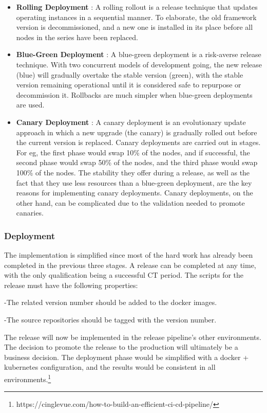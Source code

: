    \begin{itemize}
     \item \textbf{Rolling Deployment} :  A rolling rollout is a release technique that updates operating instances in a sequential manner. To elaborate, the old framework version is decommissioned, and a new one is installed in its place before all nodes in the series have been replaced.
     \item \textbf{Blue-Green Deployment} : A blue-green deployment is a risk-averse release technique. With two concurrent models of development going, the new release (blue) will gradually overtake the stable version (green), with the stable version remaining operational until it is considered safe to repurpose or decommission it. Rollbacks are much simpler when blue-green deployments are used.
     \item \textbf{Canary Deployment} :  A canary deployment is an evolutionary update approach in which a new upgrade (the canary) is gradually rolled out before the current version is replaced. Canary deployments are carried out in stages. For eg, the first phase would swap 10\% of the nodes, and if successful, the second phase would swap 50\% of the nodes, and the third phase would swap 100\% of the nodes. The stability they offer during a release, as well as the fact that they use less resources than a blue-green deployment, are the key reasons for implementing canary deployments. Canary deployments, on the other hand, can be complicated due to the validation needed to promote canaries.
   \end{itemize}


\subsubsection{Deployment}

The implementation is simplified since most of the hard work has already been completed in the previous three stages. A release can be completed at any time, with the only qualification being a successful CT period. The scripts for the release must have the following properties:

\hspace{10mm} -The related version number should be added to the docker images.


\hspace{10mm} -The source repositories should be tagged with the version number.

The release will now be implemented in the release pipeline's other environments. The decision to promote the release to the production will ultimately be a business decision. The deployment phase would be simplified with a docker + kubernetes configuration, and the results would be consistent in all environments.\footnote{https://cinglevue.com/how-to-build-an-efficient-ci-cd-pipeline/}


